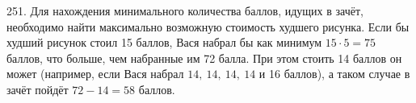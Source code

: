 251. Для нахождения минимального количества баллов, идущих в зачёт, необходимо найти максимально возможную стоимость худшего рисунка. Если бы худший рисунок стоил 15 баллов, Вася набрал бы как минимум $15\cdot5=75$ баллов, что больше, чем набранные им 72 балла. При этом стоить 14 баллов он может (например, если Вася набрал $14,\ 14,\ 14,\ 14$ и 16 баллов), а таком случае в зачёт пойдёт $72-14=58$ баллов.\\
